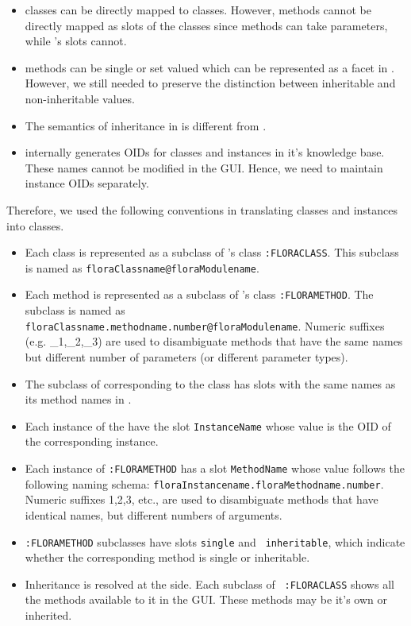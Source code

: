 \begin{itemize}
\item \fl classes can be directly mapped to \Protege classes. However,
  \fl
methods cannot be directly mapped as slots of the
\Protege classes since \fl methods can take parameters, while \Protege's
  slots cannot.
\item \fl methods can be single or set valued which can be represented
as a facet in \NoProtege. However, we still needed to preserve the
distinction between inheritable and non-inheritable values.
\item The semantics of inheritance in \Protege is different from \fl.
\item \Protege internally generates OIDs for classes and instances
in it's knowledge base. These names cannot be modified in the GUI.
Hence, we need to maintain \fl instance OIDs separately.
\end{itemize}

Therefore, we used the following conventions in translating \fl classes and
instances into \Protege classes.

\begin{itemize}
\item Each \fl class is represented as a subclass of \Protege's
  class {\tt :FLORACLASS}. This
  subclass is named as {\tt floraClassname@floraModulename}.
\item Each \fl method is represented as a subclass of \Protege's class {\tt :FLORAMETHOD}. The
subclass is named as {\tt
floraClassname.methodname.number@floraModulename}. Numeric suffixes (e.g.
\_1,\_2,\_3) are used to disambiguate methods that have the same names but
different number of parameters (or different parameter types).
\item The subclass of  corresponding to the \fl class
has slots with the same names as its \fl method names in \FLSYSTEM.
\item Each instance of the 
have the slot {\tt InstanceName} whose value is the OID of the
corresponding \fl instance.
\item Each instance of {\tt :FLORAMETHOD} has a slot
  {\tt MethodName} whose value follows the following naming schema:
{\tt floraInstancename.floraMethodname.number}. Numeric suffixes 1,2,3,
  etc.,  are used to disambiguate methods that have identical names, but
  different numbers of arguments.
\item {\tt :FLORAMETHOD} subclasses have slots {\tt single} and {\tt
inheritable}, which indicate
whether the corresponding \fl method is
single or inheritable.
\item Inheritance is resolved at the \FLSYSTEM side. Each subclass of {\tt
    :FLORACLASS} shows all the methods available to it in the \Protege GUI.
  These methods may be it's own  or inherited.
\end{itemize}

